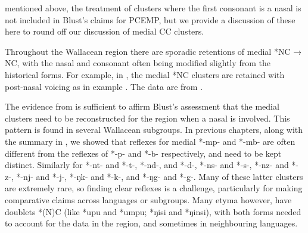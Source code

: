  mentioned above,
the treatment of clusters where the first consonant is a nasal
is not included in Blust’s claims for PCEMP,
but we provide a discussion of these here to round off our discussion
of medial CC clusters.

Throughout the Wallacean region there are sporadic retentions
of medial *NC → NC,
with the nasal and consonant often being modified slightly from the historical forms.
For example, in ,
the medial *NC clusters are retained with post-nasal voicing
as in example .
The data are from \citet[54]{Blust2008}.


The evidence from  is sufficient to affirm Blust’s assessment
that the medial clusters need to be reconstructed for the region
when a nasal is involved.
This pattern is found in several Wallacean subgroups.
In previous chapters, along with the summary in ,
we showed that reflexes for medial *-mp-
and *-mb- are often different from the reflexes of *-p-
and *-b- respectively, and need to be kept distinct.
Similarly for *-nt- and *-t-, *-nd-,
and *-d-, *-ns- and *-s-, *-nz-
and *-z-, *-nj- and *-j-, *-ŋk-
and *-k-, and *-ŋg- and *-g-.
Many of these latter clusters are extremely rare,
so finding clear reflexes is a challenge,
particularly for making comparative claims across languages or subgroups.
Many etyma however, have doublets *(N)C (like *upu
and *umpu; *ŋisi and *ŋinsi), with both forms needed to account
for the data in the region,
and sometimes in neighbouring languages.

